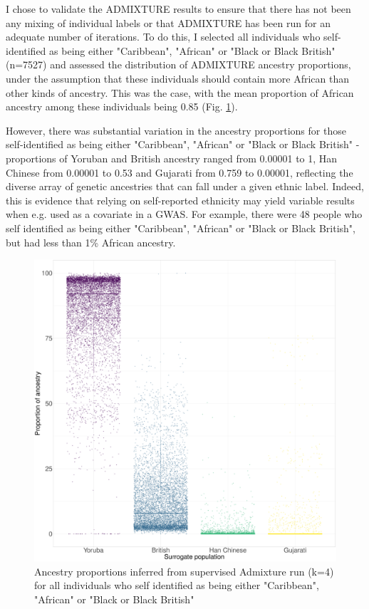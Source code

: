 I chose to validate the ADMIXTURE results to ensure that there has not been any mixing of individual labels or that ADMIXTURE has been run for an adequate number of iterations. To do this, I selected all individuals who self-identified as being either "Caribbean", "African" or "Black or Black British" (n=7527) and assessed the distribution of ADMIXTURE ancestry proportions, under the assumption that these individuals should contain more African than other kinds of ancestry. This was the case, with the mean proportion of African ancestry among these individuals being 0.85 (Fig. \ref{fig:African_Inds_proportions_ADMIXTURE}).

However, there was substantial variation in the ancestry proportions for those self-identified as being either "Caribbean", "African" or "Black or Black British" - proportions of Yoruban and British ancestry ranged from 0.00001 to 1, Han Chinese from 0.00001 to 0.53 and Gujarati from 0.759 to 0.00001, reflecting the diverse array of genetic ancestries that can fall under a given ethnic label. Indeed, this is evidence that relying on self-reported ethnicity may yield variable results when e.g. used as a covariate in a GWAS. For example, there were 48 people who self identified as being either "Caribbean", "African" or "Black or Black British", but had less than 1\% African ancestry.

\begin{figure}[htp]
    \centering
    \includegraphics[width=1.0\textwidth]{../images/chapter3/African_Inds_proportions.pdf}
    \caption{Ancestry proportions inferred from supervised Admixture run (k=4) for all individuals who self identified as being either "Caribbean", "African" or "Black or Black British"}
    \label{fig:African_Inds_proportions_ADMIXTURE}
\end{figure}


